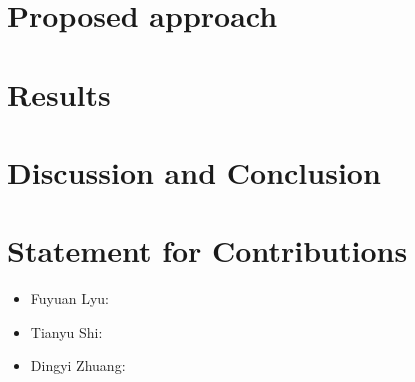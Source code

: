 \documentclass[11pt]{scrartcl}
\begin{document}
\section{Proposed approach}


\section{Results}


\section{Discussion and Conclusion}

\section{Statement for Contributions}
\begin{itemize}
	\item Fuyuan Lyu: 
	\item Tianyu Shi: 
	\item Dingyi Zhuang: 
\end{itemize}
\newpage



\end{document}
